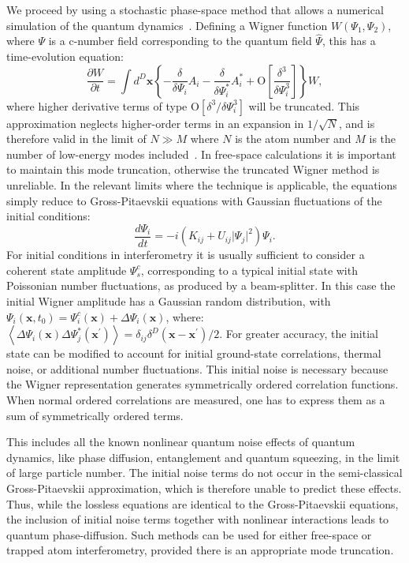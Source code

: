 \documentclass[aps,prl,twocolumn,showpacs,amsmath,amssymb,superscriptaddress,flushbottom,noraggedfooter]{revtex4-1}
\newcommand{\xvec}{\boldsymbol{x}}
\newcommand{\Psivec}{\boldsymbol{\Psi}}
\begin{document}
We proceed by using a stochastic phase-space method that allows a numerical
simulation of the quantum dynamics~\cite{Drummond1993,Steel1998,Hoffmann2008}.
Defining a Wigner function $W(\Psi_1, \Psi_2)$, where $\Psi$
is a c-number field corresponding to the quantum field $\hat{\Psi}$, this has a time-evolution equation:
\begin{equation}
	\frac{\partial W}{\partial t} = \int d^D\xvec \left\{
		- \frac{\delta}{\delta\Psi_i} A_i
		- \frac{\delta}{\delta\Psi_i^*}A_i^*
		+ \mbox{O} \left[ \frac{\delta^3}{\delta\Psi_i^3} \right]
	\right\} W,
\end{equation}
where higher derivative terms of type $\mbox{O} \left[ \delta^3 / \delta\Psi_i^3 \right]$ will be truncated.
This approximation neglects higher-order terms in an expansion in $1 / \sqrt{N}$,
and is therefore valid in the limit of $N \gg M$
where $N$ is the atom number and $M$ is the number of low-energy modes included~\cite{Drummond1993,Sinatra2002,Norrie2006}.
In free-space calculations it is important to maintain this mode truncation,
otherwise the truncated Wigner method is unreliable.
In the relevant limits where the technique is applicable, the equations
simply reduce to Gross-Pitaevskii equations with Gaussian fluctuations
of the initial conditions:
\begin{equation}
\label{eqn:SDE-1}
	\frac{d\Psi_i}{dt} = -i \left(
		K_{ij} + U_{ij} \lvert \Psi_j \rvert^2
	\right) \Psi_i.
\end{equation}
For initial conditions in interferometry it is usually sufficient to consider
a coherent state amplitude $\Psi_s^c$,
corresponding to a typical initial state with Poissonian number fluctuations,
as produced by a beam-splitter.
In this case the initial Wigner amplitude has a Gaussian random distribution, with
$\Psi_i(\xvec, t_0) = \Psi_i^c(\xvec) + \Delta \Psi_i(\xvec)$, where:
$\left\langle \Delta \Psi_i(\xvec) \Delta \Psi_j^*(\xvec^{\prime}) \right\rangle =
\delta_{ij} \delta^D(\xvec - \xvec^{\prime}) / 2.$
For greater accuracy, the initial state can be modified to account for
initial ground-state correlations, thermal noise, or additional number fluctuations.
This initial noise is necessary because the Wigner representation generates
symmetrically ordered correlation functions.
When normal ordered correlations are measured, one has to express them
as a sum of symmetrically ordered terms.

This includes all the known nonlinear quantum noise effects of quantum dynamics,
like phase diffusion, entanglement and quantum squeezing, in the limit
of large particle number.
The initial noise terms do not occur in the semi-classical Gross-Pitaevskii
approximation, which is therefore unable to predict these effects.
Thus, while the lossless equations are identical to the Gross-Pitaevskii
equations, the inclusion of initial noise terms together with nonlinear
interactions leads to quantum phase-diffusion.
Such methods can be used for either free-space or trapped atom interferometry,
provided there is an appropriate mode truncation.
\end{document}
